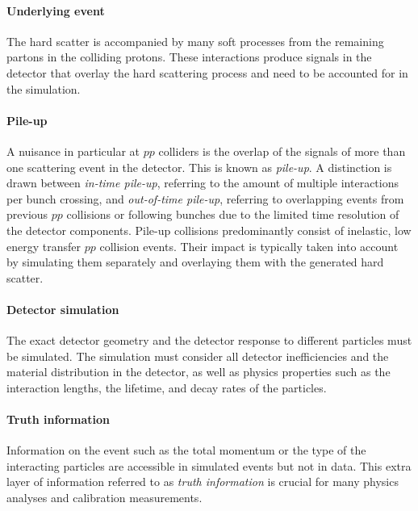 \paragraph{Underlying event}
The hard scatter is accompanied by many soft processes from the remaining partons in the colliding protons. These interactions produce signals in the detector that overlay the hard scattering process and need to be accounted for in the simulation.
\paragraph{Pile-up}
A nuisance in particular at $pp$ colliders is the overlap of the signals of more than one scattering event in the detector. This is known as \emph{pile-up}. A distinction is drawn between \emph{in-time pile-up}, referring to the amount of multiple interactions per bunch crossing, and \emph{out-of-time pile-up}, referring to overlapping events from previous $pp$ collisions or following bunches due to the limited time resolution of the detector components.
Pile-up collisions predominantly consist of inelastic, low energy transfer $pp$ collision events. 
Their impact is typically taken into account by simulating them separately and overlaying them with the generated hard scatter.
\paragraph{Detector simulation}
The exact detector geometry and the detector response to different particles must be simulated.
The simulation must consider all detector inefficiencies and the material distribution in the detector, as well as physics properties such as the interaction lengths, the lifetime, and decay rates of the particles.

\paragraph{Truth information}
Information on the event such as the total momentum or the type of the interacting particles are accessible in simulated events but not in data. This extra layer of information referred to as \emph{truth information} is crucial for many physics analyses and calibration measurements.

